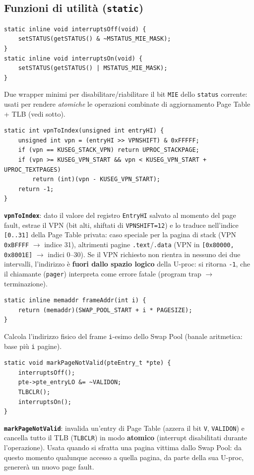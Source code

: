 \documentclass[11pt,a4paper]{article}
\newcommand{\code}[1]{\texttt{#1}}
\newcommand{\func}[1]{\textbf{\texttt{#1}}}
\begin{document}
\subsection{Funzioni di utilità (\code{static})}

\begin{lstlisting}
static inline void interruptsOff(void) {
    setSTATUS(getSTATUS() & ~MSTATUS_MIE_MASK);
}
static inline void interruptsOn(void) {
    setSTATUS(getSTATUS() | MSTATUS_MIE_MASK);
}
\end{lstlisting}
Due wrapper minimi per disabilitare/riabilitare il bit \code{MIE} dello
\code{status} corrente: usati per rendere \emph{atomiche} le operazioni
combinate di aggiornamento Page Table + TLB (vedi sotto).

\begin{lstlisting}
static int vpnToIndex(unsigned int entryHI) {
    unsigned int vpn = (entryHI >> VPNSHIFT) & 0xFFFFF;
    if (vpn == KUSEG_STACK_VPN) return UPROC_STACKPAGE;
    if (vpn >= KUSEG_VPN_START && vpn < KUSEG_VPN_START + UPROC_TEXTPAGES)
        return (int)(vpn - KUSEG_VPN_START);
    return -1;
}
\end{lstlisting}
\func{vpnToIndex}: dato il valore del registro \code{EntryHI} salvato al
momento del page fault, estrae il VPN (bit alti, shiftati di
\code{VPNSHIFT=12}) e lo traduce nell'indice \code{[0..31]} della Page
Table privata: caso speciale per la pagina di stack (VPN
\code{0xBFFFF} $\to$ indice 31), altrimenti pagine \code{.text}/\code{.data}
(VPN in \code{[0x80000, 0x8001E]} $\to$ indici 0--30). Se il VPN richiesto
non rientra in nessuno dei due intervalli, l'indirizzo è \textbf{fuori dallo
spazio logico} della U-proc: si ritorna \code{-1}, che il chiamante
(\code{pager}) interpreta come errore fatale (program trap $\to$
terminazione).

\begin{lstlisting}
static inline memaddr frameAddr(int i) {
    return (memaddr)(SWAP_POOL_START + i * PAGESIZE);
}
\end{lstlisting}
Calcola l'indirizzo fisico del frame \code{i}-esimo dello Swap Pool (banale
aritmetica: base più \code{i} pagine).

\begin{lstlisting}
static void markPageNotValid(pteEntry_t *pte) {
    interruptsOff();
    pte->pte_entryLO &= ~VALIDON;
    TLBCLR();
    interruptsOn();
}
\end{lstlisting}
\func{markPageNotValid}: invalida un'entry di Page Table (azzera il bit
\code{V}, \code{VALIDON}) e cancella tutto il TLB (\code{TLBCLR}) in modo
\textbf{atomico} (interrupt disabilitati durante l'operazione). Usata
quando si sfratta una pagina vittima dallo Swap Pool: da questo momento
qualunque accesso a quella pagina, da parte della sua U-proc, genererà un
nuovo page fault.
\end{document}
